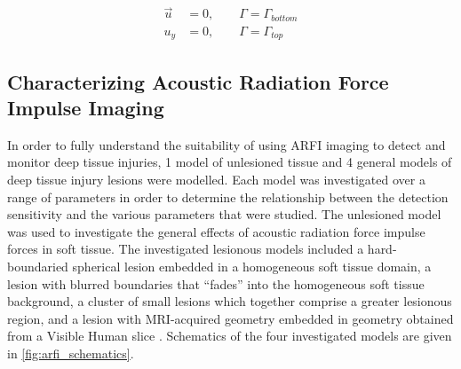 			\begin{subequations}
				\label{equ:arfi_fea_fixed_bc}
				\begin{align}
					\vec{u} &= 0, \qquad \Gamma = \Gamma_{bottom} \\
					u_y &= 0, \qquad \Gamma = \Gamma_{top}
				\end{align}
			\end{subequations}

		\FloatBarrier
		\subsection{Characterizing Acoustic Radiation Force Impulse Imaging}
		\label{subsec:arfi_method_characterization}
			In order to fully understand the suitability of using ARFI imaging to detect and monitor deep tissue injuries, 1 model of unlesioned tissue and 4 general models of deep tissue injury lesions were modelled. Each model was investigated over a range of parameters in order to determine the relationship between the detection sensitivity and the various parameters that were studied. The unlesioned model was used to investigate the general effects of acoustic radiation force impulse forces in soft tissue. The investigated lesionous models included a hard-boundaried spherical lesion embedded in a homogeneous soft tissue domain, a lesion with blurred boundaries that ``fades'' into the homogeneous soft tissue background, a cluster of small lesions which together comprise a greater lesionous region, and a lesion with MRI-acquired geometry \cite{solis13} embedded in geometry obtained from a Visible Human slice \cite{visiblehuman}. Schematics of the four investigated models are given in \ref{fig:arfi_schematics}.

